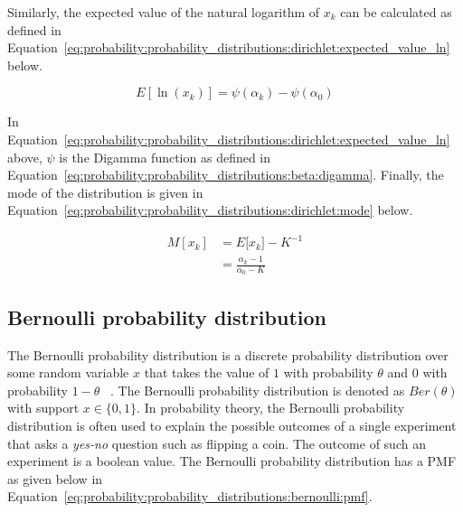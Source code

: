 \noindent
Similarly, the expected value of the natural logarithm of $x_{k}$ can be calculated as defined in Equation~\eqref{eq:probability:probability_distributions:dirichlet:expected_value_ln} below.

\begin{equation}
      \label{eq:probability:probability_distributions:dirichlet:expected_value_ln}
      E[\ln(x_{k})] = \psi({\alpha_{k}}) - \psi(\alpha_{0})
\end{equation}

\noindent
In Equation~\eqref{eq:probability:probability_distributions:dirichlet:expected_value_ln} above, $\psi$ is the Digamma function as defined in Equation~\eqref{eq:probability:probability_distributions:beta:digamma}. Finally, the mode of the distribution is given in Equation~\eqref{eq:probability:probability_distributions:dirichlet:mode} below.

\begin{equation}
      \label{eq:probability:probability_distributions:dirichlet:mode}
      \begin{split}
            M[x_{k}] &= E[{x_{k}] -K^{-1}} \\
            &=  \frac{\alpha_{k} - 1}{\alpha_{0} - K}
      \end{split}
\end{equation}


\subsection{Bernoulli probability distribution}\label{sec:probability:probability_distributions:bernoulli}

The Bernoulli probability distribution is a discrete probability distribution over some random variable $x$ that takes the value of $1$ with probability $\theta$ and $0$ with probability $1-\theta$ ~\cite{ref:wackerly:2014}. The Bernoulli probability distribution is denoted as $Ber(\theta)$ with support $x \in \{0, 1\}$. In probability theory, the Bernoulli probability distribution is often used to explain the possible outcomes of a single experiment that asks a \textit{yes-no} question such as flipping a coin. The outcome of such an experiment is a boolean value. The Bernoulli probability distribution has a \acf{PMF} as given below in Equation~\eqref{eq:probability:probability_distributions:bernoulli:pmf}.

